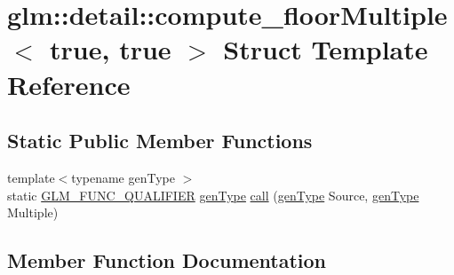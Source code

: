\hypertarget{structglm_1_1detail_1_1compute__floor_multiple_3_01true_00_01true_01_4}{}\section{glm\+:\+:detail\+:\+:compute\+\_\+floor\+Multiple$<$ true, true $>$ Struct Template Reference}
\label{structglm_1_1detail_1_1compute__floor_multiple_3_01true_00_01true_01_4}
\subsection*{Static Public Member Functions}
\begin{DoxyCompactItemize}
\item 
{\footnotesize template$<$typename gen\+Type $>$ }\\static \mbox{\hyperlink{setup_8hpp_a33fdea6f91c5f834105f7415e2a64407}{G\+L\+M\+\_\+\+F\+U\+N\+C\+\_\+\+Q\+U\+A\+L\+I\+F\+I\+ER}} \mbox{\hyperlink{structglm_1_1detail_1_1gen_type}{gen\+Type}} \mbox{\hyperlink{structglm_1_1detail_1_1compute__floor_multiple_3_01true_00_01true_01_4_a18fef0ea82a4549501b832f4571ab1c5}{call}} (\mbox{\hyperlink{structglm_1_1detail_1_1gen_type}{gen\+Type}} Source, \mbox{\hyperlink{structglm_1_1detail_1_1gen_type}{gen\+Type}} Multiple)
\end{DoxyCompactItemize}


\subsection{Member Function Documentation}
\mbox{\label{structglm_1_1detail_1_1compute__floor_multiple_3_01true_00_01true_01_4_a18fef0ea82a4549501b832f4571ab1c5}} 
